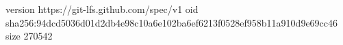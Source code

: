 version https://git-lfs.github.com/spec/v1
oid sha256:94dcd5036d01d2db4e98c10a6e102ba6ef6213f0528ef958b11a910d9e69cc46
size 270542
